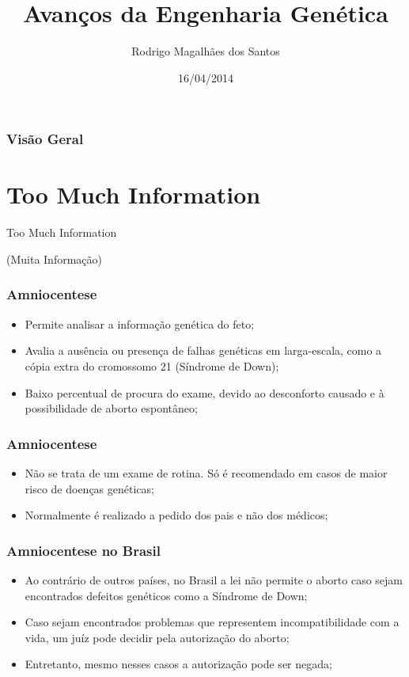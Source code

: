 \documentclass{beamer}
\title[Avanços da Engenharia Genética]{Avanços da Engenharia Genética}
\author{Rodrigo Magalhães dos Santos}
\institute[IPT]
{
Instituto de Pesquisas Tecnológicas \\ Universidade de São Paulo \\
\medskip
\textit{rmagalhaes85@gmail.com}
}
\date{16/04/2014}
\begin{document}
\begin{frame}
\titlepage
\end{frame}

\begin{frame}
\frametitle{Visão Geral}
\tableofcontents 
\end{frame}


\section{Too Much Information} 

\begin{frame}
\huge{\centerline{Too Much Information}}
\normalsize{\centerline{(Muita Informação)}}
\end{frame}

\begin{frame}
\frametitle{Amniocentese}
\begin{itemize}
\item Permite analisar a informação genética do feto;
\item Avalia a ausência ou presença de falhas genéticas em larga-escala, como a cópia extra do cromossomo 21 (Síndrome de Down);
\item Baixo percentual de procura do exame, devido ao desconforto causado e à possibilidade de aborto espontâneo;
\end{itemize}
\end{frame}

\begin{frame}
\frametitle{Amniocentese}
\begin{itemize}
\item Não se trata de um exame de rotina. Só é recomendado em casos de maior risco de doenças genéticas;
\item Normalmente é realizado a pedido dos pais e não dos médicos;
\end{itemize}
\end{frame}

\begin{frame}
\frametitle{Amniocentese no Brasil}
\begin{itemize}
\item Ao contrário de outros países, no Brasil a lei não permite o aborto caso sejam encontrados defeitos genéticos como a Síndrome de Down;
\item Caso sejam encontrados problemas que representem incompatibilidade com a vida, um juíz pode decidir pela autorização do aborto;
\item Entretanto, mesmo nesses casos a autorização pode ser negada;
\end{itemize}
\end{frame}
\end{document}
